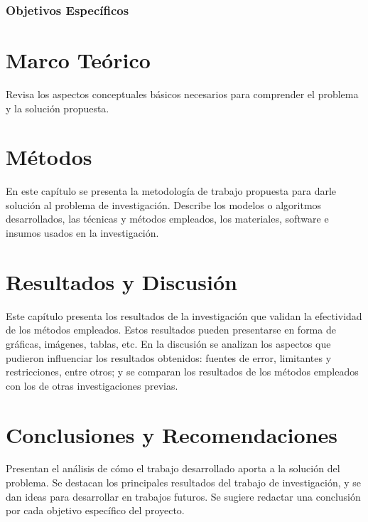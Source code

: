 \documentclass[12pt]{report}
\begin{document}
\subsection{Objetivos Específicos}

\chapter{Marco Teórico} \label{sec:Marco}

Revisa los aspectos conceptuales básicos necesarios para comprender el problema y la solución propuesta.

\chapter{Métodos} \label{sec:Metodos}

En este capítulo se presenta la metodología de trabajo propuesta para darle solución al problema de investigación. Describe los modelos o algoritmos desarrollados, las técnicas y  métodos empleados, los materiales, software e insumos usados en la investigación.

\chapter{Resultados y Discusión} \label{sec:Resultados}

Este capítulo presenta los resultados de la investigación que validan la efectividad de los métodos empleados. Estos resultados pueden presentarse en forma de gráficas, imágenes, tablas, etc. En la discusión se analizan los aspectos que pudieron influenciar los resultados obtenidos: fuentes de error, limitantes y restricciones, entre otros; y se comparan los resultados de los métodos empleados con los de otras investigaciones previas.

\chapter{Conclusiones y Recomendaciones} \label{sec:Conclusiones}

Presentan el análisis de cómo el trabajo desarrollado aporta a la solución del problema. Se destacan los principales resultados del trabajo de investigación, y se dan ideas para desarrollar en trabajos futuros. Se sugiere redactar una conclusión por cada objetivo específico del proyecto.
\end{document}
